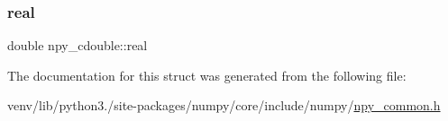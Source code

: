 \mbox{\label{structnpy__cdouble_a872c7c66bd199d63a9f1aa85b0cf382b}} 
\subsubsection{\texorpdfstring{real}{real}}
{\footnotesize\ttfamily double npy\+\_\+cdouble\+::real}



The documentation for this struct was generated from the following file\+:\begin{DoxyCompactItemize}
\item 
venv/lib/python3./site-\/packages/numpy/core/include/numpy/\hyperlink{npy__common_8h}{npy\+\_\+common.\+h}\end{DoxyCompactItemize}
